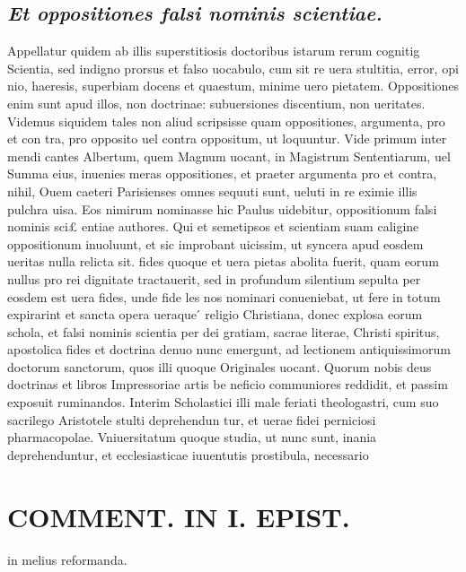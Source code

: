 \documentclass{article}
\begin{document}
\begin{pages}
\subsection*{\textit{Et oppositiones falsi nominis scientiae. }}\pstart Appellatur quidem ab illis superstitiosis doctoribus istarum rerum cognitig Scientia, sed indigno prorsus et falso uocabulo, cum sit re uera stultitia, error, opi nio, haeresis, superbiam docens et quaestum, minime uero pietatem. Oppositiones enim sunt apud illos, non doctrinae: subuersiones discentium, non ueritates. Videmus siquidem tales non aliud scripsisse quam oppositiones, argumenta, pro et con tra, pro opposito uel contra oppositum, ut loquuntur. Vide primum inter mendi cantes Albertum, quem Magnum uocant, in Magistrum Sententiarum, uel Summa eius, inuenies meras oppositiones, et praeter argumenta pro et contra, nihil, Ouem caeteri Parisienses omnes sequuti sunt, ueluti in re eximie illis pulchra uisa. Eos nimirum nominasse hic Paulus uidebitur, oppositionum falsi nominis sci£ entiae authores. Qui et semetipsos et scientiam suam caligine oppositionum inuoluunt, et sic improbant uicissim, ut syncera apud eosdem ueritas nulla relicta sit. fides quoque et uera pietas abolita fuerit, quam eorum nullus pro rei dignitate tractauerit, sed in profundum silentium sepulta per eosdem est uera fides, unde fide les nos nominari conueniebat, ut fere in totum expirarint et sancta opera ueraque ́ religio Christiana, donec explosa eorum schola, et falsi nominis scientia per dei gratiam, sacrae literae, Christi spiritus, apostolica fides et doctrina denuo nunc emergunt, ad lectionem antiquissimorum doctorum sanctorum, quos illi quoque Originales uocant. Quorum nobis deus doctrinas et libros Impressoriae artis be neficio communiores reddidit, et passim exposuit ruminandos. Interim Scholastici illi male feriati theologastri, cum suo sacrilego Aristotele stulti deprehendun tur, et uerae fidei perniciosi pharmacopolae. Vniuersitatum quoque studia, ut nunc sunt, inania deprehenduntur, et ecclesiasticae iuuentutis prostibula, necessario  \pend
\section*{COMMENT. IN I. EPIST. }
\marginpar{[ p.544 ]}\pstart in melius reformanda.  \pend
{}
{}

\end{pages}
\end{document}
